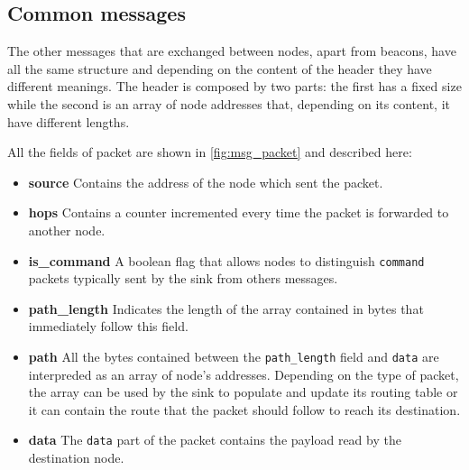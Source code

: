 \subsection{Common messages}

The other messages that are exchanged between nodes, apart from beacons, have all the same structure and depending on the content of the header they have different meanings. 
The header is composed by two parts: the first has a fixed size while the second is an array of node addresses that, depending on its content, it have different lengths.

All the fields of packet are shown in \cref{fig:msg_packet} and described here:

\begin{itemize}

\item \textbf{source} Contains the address of the node which sent the packet.

\item \textbf{hops} Contains a counter incremented every time the packet is forwarded to another node.

\item \textbf{is\_command} A boolean flag that allows nodes to distinguish \texttt{command} packets typically sent by the sink from others messages.

\item \textbf{path\_length} Indicates the length of the array contained in bytes that immediately follow this field.

\item \textbf{path} All the bytes contained between the \texttt{path\_length} field and \texttt{data} are interpreded as an array of node's addresses. Depending on the type of packet, the array can be used by the sink to populate and update its routing table or it can contain the route that the packet should follow to reach its destination.

\item \textbf{data} The \texttt{data} part of the packet contains the payload read by the destination node.

\end{itemize}

